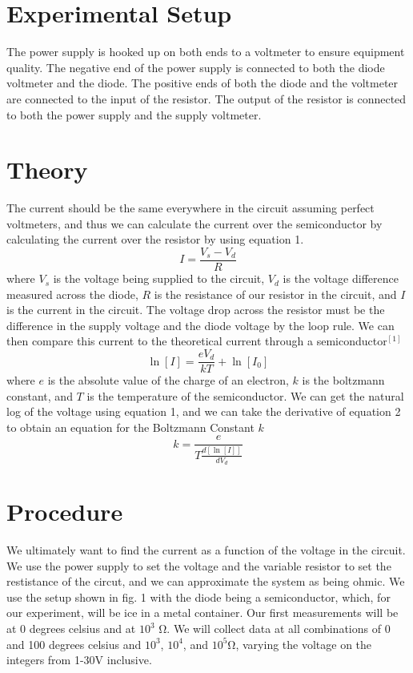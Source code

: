\documentclass[12pt, a4paper]{article}
\begin{document}
\section{Experimental Setup}
	The power supply is hooked up on both ends to a voltmeter to ensure equipment quality. The negative end of the power supply is connected to both the diode voltmeter and the diode. The positive ends of both the diode and the voltmeter are connected to the input of the resistor. The output of the resistor is connected to both the power supply and the supply voltmeter.

\section{Theory}
	The current should be the same everywhere in the circuit assuming perfect voltmeters, and thus we can calculate the current over the semiconductor by calculating the current over the resistor by using equation 1.
	\begin{equation}
		I = \frac{V_s - V_d}{R}
		\label{eq. 1}
	\end{equation}
	where $V_s$ is the voltage being supplied to the circuit, $V_d$ is the voltage difference measured across the diode, $R$ is the resistance of our resistor in the circuit, and $I$ is the current in the circuit. The voltage drop across the resistor must be the difference in the supply voltage and the diode voltage by the loop rule. We can then compare this current to the theoretical current through a semiconductor$^{[1]}$
	\begin{equation}
		\ln [I] = \frac{e V_d}{kT} + \ln [I_0]
		\label{eq. 2}
	\end{equation}
	where $e$ is the absolute value of the charge of an electron, $k$ is the boltzmann constant, and $T$ is the temperature of the semiconductor. We can get the natural log of the voltage using equation 1, and we can take the derivative of equation 2 to obtain an equation for the Boltzmann Constant $k$
	\begin{equation}
		k = \frac{e}{T\frac{d[\ln [I]]}{dV_d}}
		\label{eq. 3}
	\end{equation}

\section{Procedure}
	We ultimately want to find the current as a function of the voltage in the circuit. We use the power supply to set the voltage and the variable resistor to set the restistance of the circut, and we can approximate the system as being ohmic. We use the setup shown in fig. 1 with the diode being a semiconductor, which, for our experiment, will be ice in a metal container. Our first measurements will be at 0 degrees celsius and at $10^3$ \si{\ohm}. We will collect data at all combinations of 0 and 100 degrees celsius and $10^3$, $10^4$, and $10^5$\si{\ohm}, varying the voltage on the integers from 1-30V inclusive. 
\end{document}
